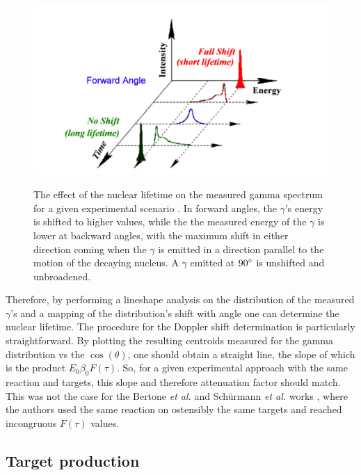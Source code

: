 \begin{figure}
\includegraphics[width=\linewidth]{figures/dopplerEffects.png}
\label{fig: dopplerShift}
\caption{The effect of the nuclear lifetime on the measured gamma spectrum for a given experimental scenario \cite{Schimpf2011}. In forward angles, the $\gamma$'s energy is shifted to higher values, while the the measured energy of the $\gamma$ is lower at backward angles, with the maximum shift in either direction coming when the $\gamma$ is emitted in a direction parallel to the motion of the decaying nucleus. A $\gamma$ emitted at $90\degree$ is unshifted and unbroadened. }
\end{figure}

Therefore, by performing a lineshape analysis on the distribution of the measured $\gamma$'s and a mapping of the distribution's shift with angle one can determine the nuclear lifetime. The procedure for the Doppler shift determination is particularly straightforward. By plotting the resulting centroids measured for the gamma distribution vs the $\cos(\theta)$, one should obtain a straight line, the slope of which is the product $E_{0} \beta_{0} F(\tau)$. So, for a given experimental approach with the same reaction and targets, this slope and therefore attenuation factor should match. This was not the case for the Bertone \textit{et al.} and Sch{\"u}rmann \textit{et al.} works \cite{Bertone2001, Schurmann2008}, where the authors used the same reaction on ostensibly the same targets and reached incongruous $F(\tau)$ values. 
 

\subsection{Target production}
\label{sec: implantation}

